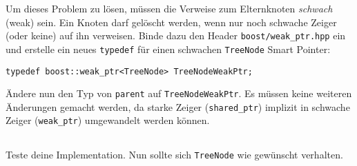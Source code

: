 Um dieses Problem zu lösen, müssen die Verweise zum Elternknoten \emph{schwach} (weak) sein.
Ein Knoten darf gelöscht werden, wenn nur noch schwache Zeiger (oder keine) auf ihn verweisen.
Binde dazu den Header \texttt{boost/weak\_ptr.hpp} ein und erstelle ein neues \texttt{typedef} für einen schwachen \texttt{TreeNode} Smart Pointer:

\begin{lstlisting}
typedef boost::weak_ptr<TreeNode> TreeNodeWeakPtr;
\end{lstlisting}

Ändere nun den Typ von \texttt{parent} auf \texttt{TreeNodeWeakPtr}.
Es müssen keine weiteren Änderungen gemacht werden, da starke Zeiger (\texttt{shared\_ptr}) implizit in schwache Zeiger (\texttt{weak\_ptr}) umgewandelt werden können.

\subsection{}
Teste deine Implementation.
Nun sollte sich \texttt{TreeNode} wie gewünscht verhalten.
